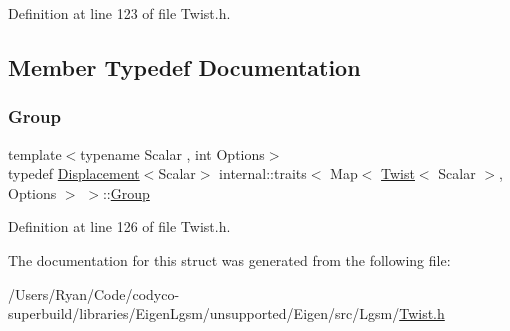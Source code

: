 Definition at line 123 of file Twist.\+h.



\subsection{Member Typedef Documentation}
\hypertarget{structinternal_1_1traits_3_01_map_3_01_twist_3_01_scalar_01_4_00_01_options_01_4_01_4_a523550b7b4340ecfa108c8f8126ed636}{}\label{structinternal_1_1traits_3_01_map_3_01_twist_3_01_scalar_01_4_00_01_options_01_4_01_4_a523550b7b4340ecfa108c8f8126ed636} 
\subsubsection{\texorpdfstring{Group}{Group}}
{\footnotesize\ttfamily template$<$typename Scalar , int Options$>$ \\
typedef \hyperlink{class_displacement}{Displacement}$<$Scalar$>$ internal\+::traits$<$ Map$<$ \hyperlink{class_twist}{Twist}$<$ Scalar $>$, Options $>$ $>$\+::\hyperlink{structinternal_1_1traits_3_01_map_3_01_lie_algebra_3_01_matrix_3_01_scalar_00_016_00_011_01_4_01_4_00_01_options_01_4_01_4_a13ab0b81517271df7b1e26758eb63b67}{Group}}



Definition at line 126 of file Twist.\+h.



The documentation for this struct was generated from the following file\+:\begin{DoxyCompactItemize}
\item 
/\+Users/\+Ryan/\+Code/codyco-\/superbuild/libraries/\+Eigen\+Lgsm/unsupported/\+Eigen/src/\+Lgsm/\hyperlink{_twist_8h}{Twist.\+h}\end{DoxyCompactItemize}
